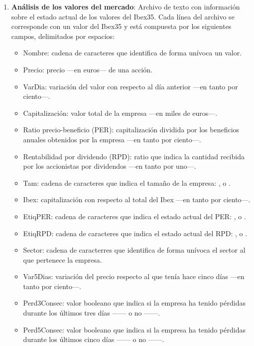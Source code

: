 \documentclass[a4paper, 11pt, titlepage]{article}
\theoremstyle{definition}
\begin{document}
\begin{enumerate}
        \item \textbf{Análisis de los valores del mercado}: Archivo de texto con información sobre el estado actual de  los valores del Ibex35. Cada línea del archivo se corresponde con un valor del Ibex35 y está compuesta por los siguientes campos, delimitados por espacios:
        \begin{itemize}
            \item Nombre: cadena de caracteres que identifica de forma unívoca un valor.
            \item Precio: precio ---en euros--- de una acción.
            \item VarDia: variación del valor con respecto al día anterior ---en tanto por ciento---.
            \item Capitalización: valor total de la empresa ---en miles de euros---.
            \item Ratio precio-beneficio (PER): capitalización dividida por los beneficios anuales obtenidos por la empresa ---en tanto por ciento---.
            \item Rentabilidad por dividendo (RPD): ratio que indica la cantidad recibida por los accionistas por dividendos ---en tanto por uno---.
            \item Tam: cadena de caracteres que indica el tamaño de la empresa: ,  o .
            \item Ibex: capitalización con respecto al total del Ibex ---en tanto por ciento---.
            \item EtiqPER: cadena de caracteres que indica el estado actual del PER: ,  o .
            \item EtiqRPD: cadena de caracteres que indica el estado actual del RPD: ,  o .
            \item Sector: cadena de caracterres que identifica de forma unívoca el sector al que pertenece la empresa.
            \item Var5Dias: variación del precio respecto al que tenía hace cinco días ---en tanto por ciento---.
            \item Perd3Consec: valor booleano que indica si la empresa ha tenido pérdidas durante los últimos tres días ------ o no ------.
            \item Perd5Consec: valor booleano que indica si la empresa ha tenido pérdidas durante los últimos cinco días ------ o no ------.

\end{itemize}
\end{enumerate}
\end{document}
